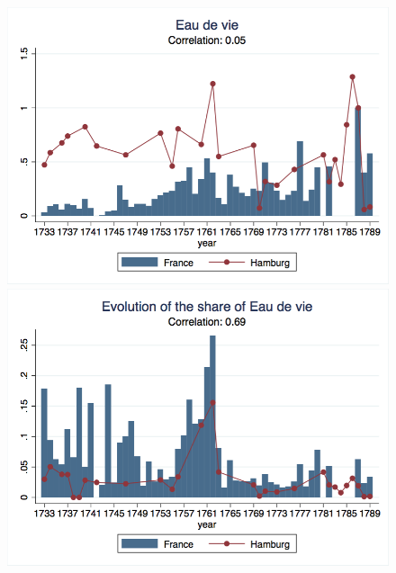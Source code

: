 \documentclass[12pt,a4paper,titlepage,english]{article}
\begin{document}
\begin{figure}
\includegraphics[scale=.28]{eaudevie_long.png}
\includegraphics[scale=.28]{eaudevie_share_long.png}\\

\end{figure}
\end{document}
